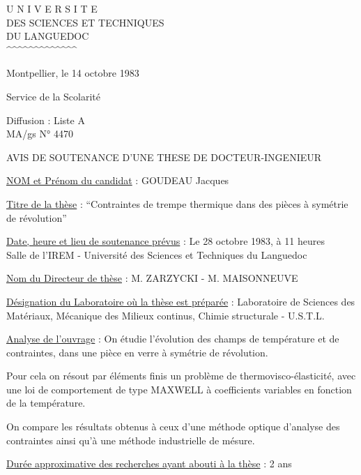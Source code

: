 
\begin{center}
U N I V E R S I T E\\
DES SCIENCES ET TECHNIQUES\\
DU LANGUEDOC\\
\textasciicircum\textasciicircum\textasciicircum\textasciicircum\textasciicircum\textasciicircum\textasciicircum\textasciicircum\textasciicircum\textasciicircum\textasciicircum\textasciicircum\textasciicircum
\end{center}

Montpellier, le 14 octobre 1983

Service de la Scolarité

Diffusion : Liste A\\
MA/gs \hfill N° 4470

\begin{center}
AVIS DE SOUTENANCE D'UNE THESE DE DOCTEUR-INGENIEUR

\end{center}

\uline{NOM et Prénom du candidat} : GOUDEAU Jacques

\uline{Titre de la thèse} : ``Contraintes de trempe thermique dans des pièces à symétrie de révolution''

\uline{Date, heure et lieu de soutenance prévus} : Le 28 octobre 1983, à 11 heures\\
Salle de l'IREM - Université des Sciences et Techniques du Languedoc

\uline{Nom du Directeur de thèse} : M. ZARZYCKI - M. MAISONNEUVE

\uline{Désignation du Laboratoire où la thèse est préparée} : Laboratoire de Sciences des Matériaux, Mécanique des Milieux continus, Chimie structurale - U.S.T.L.

\uline{Analyse de l'ouvrage} : On étudie l'évolution des champs de température et de contraintes, dans une pièce en verre à symétrie de révolution.

Pour cela on résout par éléments finis un problème de thermovisco-élasticité, avec une loi de comportement de type MAXWELL à coefficients variables en fonction de la température.

On compare les résultats obtenus à ceux d'une méthode optique d'analyse des contraintes ainsi qu'à une méthode industrielle de mésure.

\uline{Durée approximative des recherches ayant abouti à la thèse} : 2 ans

